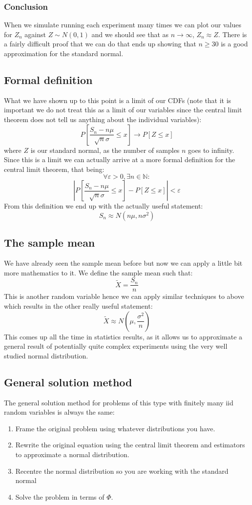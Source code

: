 \documentclass[12pt]{article}
\begin{document}
\subsubsection*{Conclusion}
When we simulate running each experiment many times we can plot our values for \(Z_n\) against \(Z\sim N(0,1)\) and we should see that as \(n\to\infty\), \(Z_n\approx Z\). There is a fairly difficult proof that we can do that ends up showing that \(n\geq 30\) is a good approximation for the standard normal.
\subsection*{Formal definition}
What we have shown up to this point is a limit of our CDFs (note that it is important we do not treat this as a limit of our variables since the central limit theorem does not tell us anything about the individual variables):
\[P\left[\frac{S_n-n\mu}{\sqrt{n}\sigma}\leq x\right]\to P[Z\leq x]\]
where \(Z\) is our standard normal, as the number of samples \(n\) goes to infinity. Since this is a limit we can actually arrive at a more formal definition for the central limit theorem, that being:
\[\forall \varepsilon>0, \exists n\in\mathbb{N}:\]
\[\left|P\left[\frac{S_n-n\mu}{\sqrt{n}\sigma}\leq x\right]-P[Z\leq x]\right|<\varepsilon\]
From this definition we end up with the actually useful statement:
\[S_n\approx N(n\mu, n\sigma^2)\]
\subsection*{The sample mean}
We have already seen the sample mean before but now we can apply a little bit more mathematics to it. We define the sample mean such that:
\[\tilde{X}=\frac{S_n}{n}\]
This is another random variable hence we can apply similar techniques to above which results in the other really useful statement:
\[\tilde{X}\approx N\left(\mu,\frac{\sigma^2}{n}\right)\]
This comes up all the time in statistics results, as it allows us to approximate a general result of potentially quite complex experiments using the very well studied normal distribution.
\subsection*{General solution method}
The general solution method for problems of this type with finitely many iid random variables is always the same:
\begin{enumerate}
    \item Frame the original problem using whatever distributions you have.
    \item Rewrite the original equation using the central limit theorem and estimators to approximate a normal distribution.
    \item Recentre the normal distribution so you are working with the standard normal
    \item Solve the problem in terms of \(\Phi\).
\end{enumerate}
\end{document}
